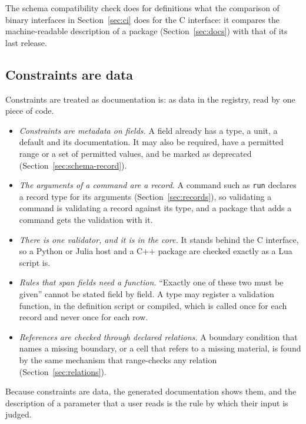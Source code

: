 \documentclass[11pt,a4paper]{article}
\newcommand{\code}[1]{\texttt{#1}}
\begin{document}
The schema compatibility check does for definitions what the comparison of
binary interfaces in Section~\ref{sec:ci} does for the C interface: it
compares the machine-readable description of a package
(Section~\ref{sec:docs}) with that of its last release.

\subsection{Constraints are data}

Constraints are treated as documentation is: as data in the registry, read
by one piece of code.

\begin{itemize}
  \item \emph{Constraints are metadata on fields.}  A field already has a
        type, a unit, a default and its documentation.  It may also be
        required, have a permitted range or a set of permitted values, and
        be marked as deprecated (Section~\ref{sec:schema-record}).
  \item \emph{The arguments of a command are a record.}  A command such as
        \code{run} declares a record type for its arguments
        (Section~\ref{sec:records}), so validating a command is validating
        a record against its type, and a package that adds a command gets
        the validation with it.
  \item \emph{There is one validator, and it is in the core.}  It stands
        behind the C interface, so a Python or Julia host and a C++ package
        are checked exactly as a Lua script is.
  \item \emph{Rules that span fields need a function.}  \enquote{Exactly
        one of these two must be given} cannot be stated field by field.  A
        type may register a validation function, in the definition script
        or compiled, which is called once for each record and never once
        for each row.
  \item \emph{References are checked through declared relations.}  A
        boundary condition that names a missing boundary, or a cell that
        refers to a missing material, is found by the same mechanism that
        range-checks any relation (Section~\ref{sec:relations}).
\end{itemize}

Because constraints are data, the generated documentation shows them, and
the description of a parameter that a user reads is the rule by which their
input is judged.
\end{document}
